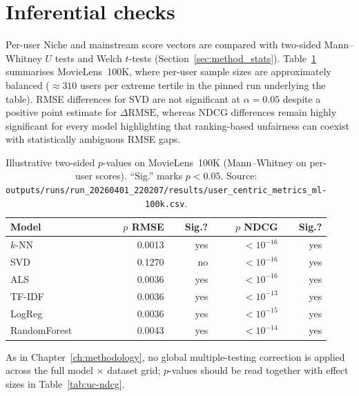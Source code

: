 \section{Inferential checks}
Per-user Niche and mainstream score vectors are compared with two-sided Mann--Whitney $U$ tests and Welch $t$-tests (Section~\ref{sec:method_stats}). Table~\ref{tab:uc-ml100k-tests} summarises MovieLens~100K, where per-user sample sizes are approximately balanced ($\approx 310$ users per extreme tertile in the pinned run underlying the table). RMSE differences for SVD are not significant at $\alpha=0.05$ despite a positive point estimate for $\Delta\mathrm{RMSE}$, whereas NDCG differences remain highly significant for every model highlighting that ranking-based unfairness can coexist with statistically ambiguous RMSE gaps.

\begin{table}[htbp]
  \centering
  \caption{Illustrative two-sided $p$-values on MovieLens~100K (Mann--Whitney on per-user scores). ``Sig.'' marks $p<0.05$. Source: \texttt{outputs/runs/run\_20260401\_220207/results/user\_centric\_metrics\_ml-100k.csv}.}
  \label{tab:uc-ml100k-tests}
  \begin{tabular}{@{}l r r r r@{}}
    \toprule
    \textbf{Model} & $p$ RMSE & Sig.? & $p$ NDCG & Sig.? \\
    \midrule
    $k$-NN       & 0.0013 & yes & $<10^{-16}$ & yes \\
    SVD          & 0.1270 & no  & $<10^{-16}$ & yes \\
    ALS          & 0.0036 & yes & $<10^{-16}$ & yes \\
    TF-IDF      & 0.0036 & yes & $<10^{-13}$ & yes \\
    LogReg       & 0.0036 & yes & $<10^{-15}$ & yes \\
    RandomForest & 0.0043 & yes & $<10^{-14}$ & yes \\
    \bottomrule
  \end{tabular}
\end{table}

\noindent As in Chapter~\ref{ch:methodology}, no global multiple-testing correction is applied across the full model $\times$ dataset grid; $p$-values should be read together with effect sizes in Table~\ref{tab:uc-ndcg}.

